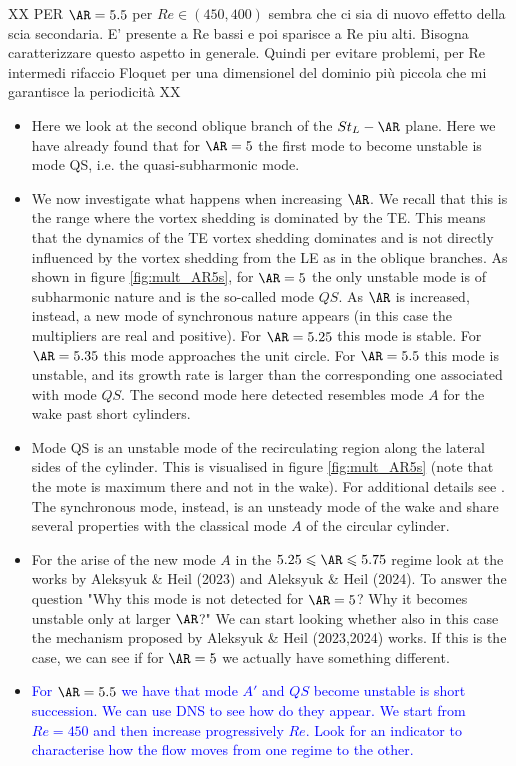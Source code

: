 XX PER $\AR=5.5$ per $Re \in (450,400)$ sembra che ci sia di nuovo effetto della scia secondaria. E' presente a Re bassi e poi sparisce a Re piu alti. Bisogna caratterizzare questo aspetto in generale. Quindi per evitare problemi, per Re intermedi rifaccio Floquet per una dimensionel del dominio più piccola che mi garantisce la periodicità XX

\begin{itemize}
  \item Here we look at the second oblique branch of the $St_L-\AR$ plane. Here we have already found that for $\AR=5$ the first mode to become unstable is mode QS, i.e. the quasi-subharmonic mode.
  \item We now investigate what happens when increasing $\AR$. We recall that this is the range where the vortex shedding is dominated by the TE. This means that the dynamics of the TE vortex shedding dominates and is not directly influenced by the vortex shedding from the LE as in the oblique branches. As shown in figure \ref{fig:mult_AR5s}, for $\AR=5$ the only unstable mode is of subharmonic nature and is the so-called mode $QS$. As $\AR$ is increased, instead, a new mode of synchronous nature appears (in this case the multipliers are real and positive). For $\AR=5.25$ this mode is stable. For $\AR=5.35$ this mode approaches the unit circle. For $\AR=5.5$ this mode is unstable, and its growth rate is larger than the corresponding one associated with mode $QS$. The second mode here detected resembles mode $A$ for the wake past short cylinders. 
  \item Mode QS is an unstable mode of the recirculating region along the lateral sides of the cylinder. This is visualised in figure \ref{fig:mult_AR5s} (note that the mote is maximum there and not in the wake). For additional details see \citep{chiarini-etal-2022}. The synchronous mode, instead, is an unsteady mode of the wake and share several properties with the classical mode $A$ of the circular cylinder.
  \item For the arise of the new mode $A$ in the $5.25 \le \AR \le 5.75$ regime look at the works by Aleksyuk \& Heil (2023) and Aleksyuk \& Heil (2024). To answer the question "Why this mode is not detected for $\AR=5$? Why it becomes unstable only at larger $\AR$?" We can start looking whether also in this case the mechanism proposed by Aleksyuk \& Heil (2023,2024) works. If this is the case, we can see if for $\AR=5$ we actually have something different. 
  \item \textcolor{blue}{For $\AR=5.5$ we have that mode $A'$ and $QS$ become unstable is short succession. We can use DNS to see how do they appear. We start from $Re=450$ and then increase progressively $Re$. Look for an indicator to characterise how the flow moves from one regime to the other.}
\end{itemize}

